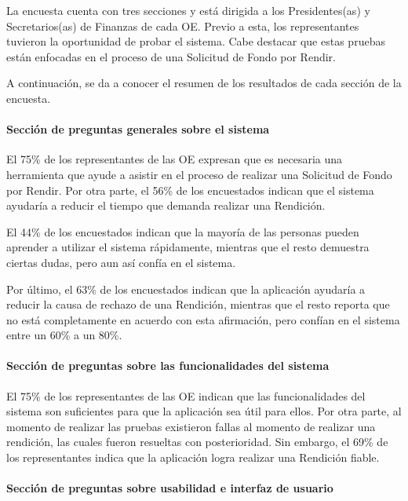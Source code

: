 La encuesta cuenta con tres secciones y está dirigida a los Presidentes(as) y Secretarios(as) de Finanzas de cada OE. Previo a esta, los representantes tuvieron la oportunidad de probar el sistema. Cabe destacar que estas pruebas están enfocadas en el proceso de una Solicitud de Fondo por Rendir.

A continuación, se da a conocer el resumen de los resultados de cada sección de la encuesta.

\paragraph{Sección de preguntas generales sobre el sistema}

El 75\% de los representantes de las OE expresan que es necesaria una herramienta que ayude a asistir en el proceso de realizar una Solicitud de Fondo por Rendir. Por otra parte, el 56\% de los encuestados indican que el sistema ayudaría a reducir el tiempo que demanda realizar una Rendición.

El 44\% de los encuestados indican que la mayoría de las personas pueden aprender a utilizar el sistema rápidamente, mientras que el resto demuestra ciertas dudas, pero aun así confía en el sistema.

Por último, el 63\% de los encuestados indican que la aplicación ayudaría a reducir la causa de rechazo de una Rendición, mientras que el resto reporta que no está completamente en acuerdo con esta afirmación, pero confían en el sistema entre un 60\% a un 80\%.

\paragraph{Sección de preguntas sobre las funcionalidades del sistema}

El 75\% de los representantes de las OE indican que las funcionalidades del sistema son suficientes para que la aplicación sea útil para ellos. Por otra parte, al momento de realizar las pruebas existieron fallas al momento de realizar una rendición, las cuales fueron resueltas con posterioridad. Sin embargo, el 69\% de los representantes indica que la aplicación logra realizar una Rendición fiable.

\paragraph{Sección de preguntas sobre usabilidad e interfaz de usuario}

